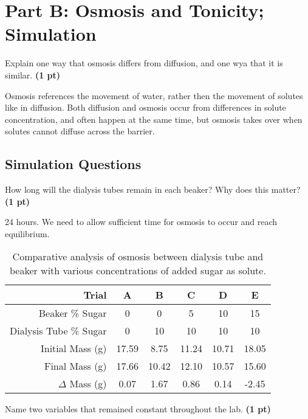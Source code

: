 \documentclass[12pt,a4paper]{article}
\begin{document}
\section*{Part B: Osmosis and Tonicity; Simulation}
\begin{enumerate}[font=\bfseries, wide, resume]
    {\color{under}\item Explain one way that osmosis differs from diffusion, and one wya that it is similar. \textbf{(1 pt)}}

    Osmosis references the movement of water, rather then the movement of solutes like in diffusion. Both diffusion and osmosis occur from differences in solute concentration, and often happen at the same time, but osmosis takes over when solutes cannot diffuse across the barrier. 
    \newpage 
\subsection*{Simulation Questions}
    {\color{under}\item How long will the dialysis tubes remain in each beaker? Why does this matter? \textbf{(1 pt)}}

    24 hours. We need to allow sufficient time for osmosis to occur and reach equilibrium.

    \begin{table}[h]
        \centering
        \caption{Comparative analysis of osmosis between dialysis tube and beaker with various concentrations of added sugar as solute. }
        \begin{tabular}{r|ccccc}
            \toprule
            Trial & A & B & C & D & E\\
            \midrule
            Beaker \% Sugar 
            & 0  &  0& 5 & 10 & 15\\
            Dialysis Tube \% Sugar
            & 0 & 10 & 10 & 10 & 10 \\
            Initial Mass (g)
            & 17.59 & 8.75 & 11.24 & 10.71 & 18.05 \\
            Final Mass (g) 
            & 17.66 & 10.42 & 12.10 & 10.57 & 15.60 \\
            $\Delta$ Mass (g)
            & 0.07 & {\color{Fresh1}1.67} & {\color{Fresh1}0.86} & 0.14 & {\color{Sun1}-2.45}\\
            \bottomrule
            \end{tabular}
    \end{table}
    

    {\color{under}\item Name two variables that remained constant throughout the lab. \textbf{(1 pt)}}


\end{enumerate}
\end{document}

